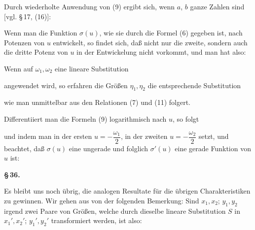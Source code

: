 Durch wiederholte Anwendung von (9) ergibt sich, wenn $a$, $b$ ganze Zahlen sind [vgl. \S\,17, (16)]:

Wenn man die Funktion $\sigma(u)$, wie sie durch die Formel (6) gegeben ist, nach Potenzen von $u$ entwickelt, so findet sich, daß nicht nur die zweite, sondern auch die dritte Potenz von $u$ in der Entwickelung nicht vorkommt, und man hat also:

Wenn auf $\omega_1, \omega_2$ eine lineare Substitution

angewendet wird, so erfahren die Größen $\eta_1, \eta_2$ die entsprechende Substitution

wie man unmittelbar aus den Relationen (7) und (11) folgert.

Differentiiert man die Formeln (9) logarithmisch nach $u$, so folgt

und indem man in der ersten $u=-\dfrac{\omega_1}{2}$, in der zweiten $u=-\dfrac{\omega_2}{2}$ setzt, und beachtet, daß $\sigma(u)$ eine ungerade und folglich $\sigma'(u)$ eine gerade Funktion von $u$ ist:


\begin{center}
\textbf{\S\,36. }
\end{center}

Es bleibt uns noch übrig, die analogen Resultate für die übrigen Charakteristiken zu gewinnen. Wir gehen aus von der folgenden Bemerkung: Sind $x_1, x_2$; $y_1, y_2$ irgend zwei Paare von Größen, welche durch dieselbe lineare Substitution $S$ in $x_1', x_2'$; $y_1', y_2'$ transformiert werden, ist also:
